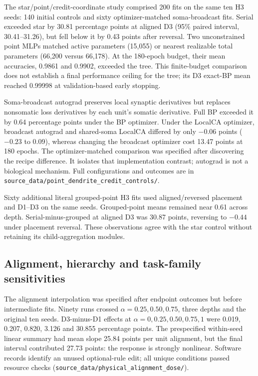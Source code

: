 The star/point/credit-coordinate study comprised 200 fits on the same ten H3 seeds: 140 initial controls and sixty optimizer-matched soma-broadcast fits. Serial exceeded star by 30.81 percentage points at aligned D3 (95\% paired interval, 30.41--31.26), but fell below it by 0.43 points after reversal. Two unconstrained point MLPs matched active parameters (15,055) or nearest realizable total parameters (66,200 versus 66,178). At the 180-epoch budget, their mean accuracies, 0.9861 and 0.9902, exceeded the tree. This finite-budget comparison does not establish a final performance ceiling for the tree; its D3 exact-BP mean reached 0.99998 at validation-based early stopping.

Soma-broadcast autograd preserves local synaptic derivatives but replaces nonsomatic loss derivatives by each unit's somatic derivative. Full BP exceeded it by 0.64 percentage points under the BP optimizer. Under the LocalCA optimizer, broadcast autograd and shared-soma LocalCA differed by only $-0.06$ points ($-0.23$ to 0.09), whereas changing the broadcast optimizer cost 13.47 points at 180 epochs. The optimizer-matched comparison was specified after discovering the recipe difference. It isolates that implementation contrast; autograd is not a biological mechanism. Full configurations and outcomes are in \texttt{source\_data/point\_dendrite\_credit\_controls/}.

Sixty additional literal grouped-point H3 fits used aligned/reversed placement and D1--D3 on the same seeds. Grouped-point means remained near 0.61 across depth. Serial-minus-grouped at aligned D3 was 30.87 points, reversing to $-0.44$ under placement reversal. These observations agree with the star control without retaining its child-aggregation modules.

\subsection{Alignment, hierarchy and task-family sensitivities}
The alignment interpolation was specified after endpoint outcomes but before intermediate fits. Ninety runs crossed $\alpha=0.25,0.50,0.75$, three depths and the original ten seeds. D3-minus-D1 effects at $\alpha=0,0.25,0.50,0.75,1$ were 0.019, 0.207, 0.820, 3.126 and 30.855 percentage points. The prespecified within-seed linear summary had mean slope 25.84 points per unit alignment, but the final interval contributed 27.73 points: the response is strongly nonlinear. Software records identify an unused optional-rule edit; all unique conditions passed resource checks (\texttt{source\_data/\allowbreak physical\_\allowbreak alignment\_\allowbreak dose/}).

